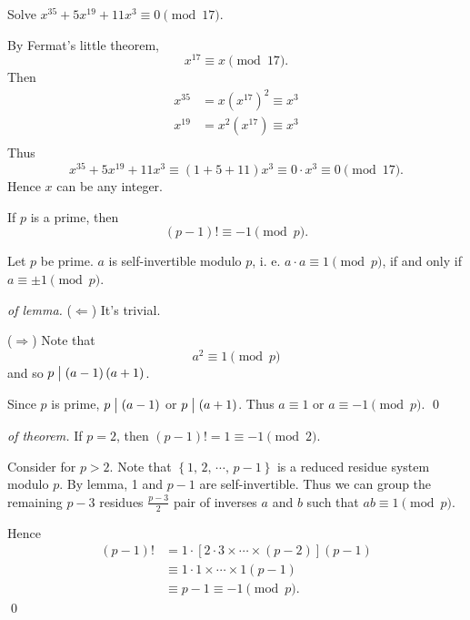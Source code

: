 \begin{example}
    Solve $x^{35}+5x^{19}+11x^3 \equiv 0\pmod{17}$.

    By Fermat's little theorem,
    \[
        x^{17} \equiv x \pmod{17}.   
    \]
    Then
    \begin{align*}
        x^{35} &= x\left(x^{17}\right)^2 \equiv x^3 \\
        x^{19} &= x^2\left(x^{17}\right) \equiv x^3 \\
    \end{align*}
    Thus
    \[
        x^{35}+5x^{19}+11x^3 \equiv \left(1+5+11\right)x^3 \equiv 0\cdot x^3 \equiv 0
        \pmod{17}.
    \]
    Hence $x$ can be any integer.
\end{example}

\begin{theorem}
    If $p$ is a prime, then
    \[
        \left(p-1\right)! \equiv -1 \pmod{p}.
    \]
\end{theorem}

\begin{lemma}
    Let $p$ be prime. $a$ is self-invertible modulo $p$,
    i. e. $a\cdot a \equiv 1\pmod{p}$, if and only if $a \equiv \pm 1\pmod{p}$.
\end{lemma}

\begin{proof}[of lemma]
    ($\Leftarrow$) It's trivial.

    ($\Rightarrow$) Note that
    \[
        a^2 \equiv 1 \pmod{p}
    \]
    and so $p \bigm| \left(a-1\right)\left(a+1\right)$.

    Since $p$ is prime, $p \bigm| \left(a-1\right)$ or $p \bigm| \left(a+1\right)$.
    Thus $a \equiv 1$ or $a \equiv -1\pmod{p}$. \qed
\end{proof}

\begin{proof}[of theorem]
    If $p=2$, then $\left(p-1\right)!=1\equiv-1\pmod{2}$.

    Consider for $p>2$. Note that $\left\{1,\,2,\,\cdots,\,p-1\right\}$ is a reduced
    residue system modulo $p$. By lemma, 1 and $p-1$ are self-invertible.
    Thus we can group the remaining $p-3$ residues
    $\frac{p-3}{2}$ pair of inverses $a$ and $b$ such that $ab \equiv 1\pmod{p}$.

    Hence
    \begin{align*}
        \left(p-1\right)!&=1\cdot\left[2\cdot3\times\cdots\times\left(p-2\right)\right]\left(p-1\right)\\
        &\equiv 1\cdot1\times\cdots\times1\left(p-1\right) \\
        &\equiv p-1 \equiv -1 \pmod{p}.
    \end{align*}
    \qed
\end{proof}


